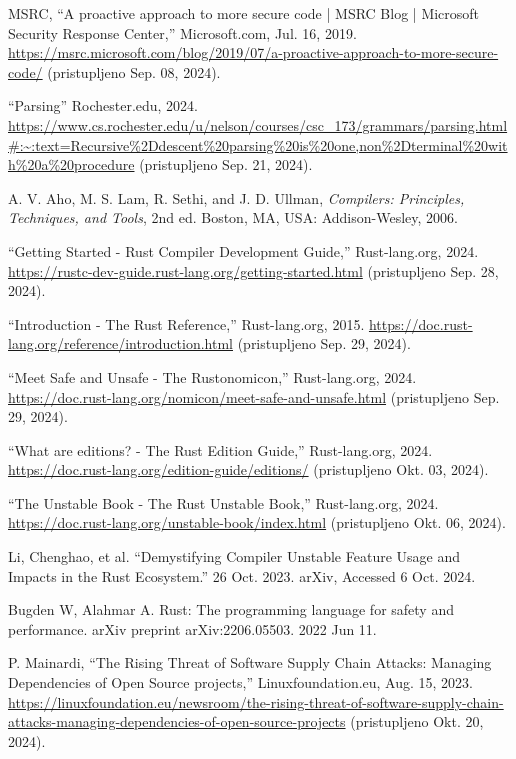 \documentclass[11pt]{article}
\begin{document}
\begin{thebibliography}
    \raggedright
{} 
    MSRC, “A proactive approach to more secure code | MSRC Blog | 
    Microsoft Security Response Center,” Microsoft.com, Jul. 16, 2019. 
    \url{https://msrc.microsoft.com/blog/2019/07/a-proactive-approach-to-more-secure-code/} 
    (pristupljeno Sep. 08, 2024).

    “Parsing” Rochester.edu, 2024.
    \url{https://www.cs.rochester.edu/u/nelson/courses/csc_173/grammars/parsing.html#:~:text=Recursive%2Ddescent%20parsing%20is%20one,non%2Dterminal%20with%20a%20procedure} 
    (pristupljeno Sep. 21, 2024).

    A. V. Aho, M. S. Lam, R. Sethi, and J. D. Ullman, \emph{Compilers: Principles, Techniques, and Tools}, 2nd ed. Boston, MA, USA: Addison-Wesley, 2006.

    “Getting Started - Rust Compiler Development Guide,” Rust-lang.org, 2024. 
    \url{https://rustc-dev-guide.rust-lang.org/getting-started.html} (pristupljeno Sep. 28, 2024).

    “Introduction - The Rust Reference,” Rust-lang.org, 2015. 
    \url{https://doc.rust-lang.org/reference/introduction.html} (pristupljeno Sep. 29, 2024).
    
    “Meet Safe and Unsafe - The Rustonomicon,” Rust-lang.org, 2024. 
    \url{https://doc.rust-lang.org/nomicon/meet-safe-and-unsafe.html} (pristupljeno Sep. 29, 2024).

    “What are editions? - The Rust Edition Guide,” Rust-lang.org, 2024.
    \url{https://doc.rust-lang.org/edition-guide/editions/} (pristupljeno Okt. 03, 2024).

    “The Unstable Book - The Rust Unstable Book,” Rust-lang.org, 2024. 
    \url{https://doc.rust-lang.org/unstable-book/index.html} (pristupljeno Okt. 06, 2024).

    Li, Chenghao, et al. “Demystifying Compiler Unstable Feature Usage and Impacts in the Rust Ecosystem.” 26 Oct. 2023. arXiv, Accessed 6 Oct. 2024. 

    Bugden W, Alahmar A. Rust: The programming language for safety and performance. arXiv preprint arXiv:2206.05503. 2022 Jun 11.

    P. Mainardi, “The Rising Threat of Software Supply Chain Attacks: Managing Dependencies of Open Source projects,” Linuxfoundation.eu, Aug. 15, 2023.
    \url{https://linuxfoundation.eu/newsroom/the-rising-threat-of-software-supply-chain-attacks-managing-dependencies-of-open-source-projects} (pristupljeno Okt. 20, 2024).
‌
\end{thebibliography}
\end{document}
